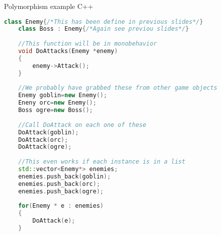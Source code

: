 \begin{frame}[fragile]{Polymorphism example C++}
	\begin{lstlisting}[language=C++,basicstyle=\tiny,]
	class Enemy{/*This has been define in previous slides*/}
	class Boss : Enemy{/*Again see previou slides*/}
	
	//This function will be in monobehavior
	void DoAttacks(Enemy *enemy)
	{
		enemy->Attack();
	}
	
	//We probably have grabbed these from other game objects
	Enemy goblin=new Enemy();
	Eneny orc=new Enemy();
	Boss ogre=new Boss();
	
	//Call DoAttack on each one of these
	DoAttack(goblin);
	DoAttack(orc);
	DoAttack(ogre);
	
	//This even works if each instance is in a list
	std::vector<Enemy*> enemies;
	enemies.push_back(goblin);
	enemies.push_back(orc);
	enemies.push_back(ogre);
	
	for(Enemy * e : enemies)
	{
		DoAttack(e);
	}
	\end{lstlisting}
\end{frame}

